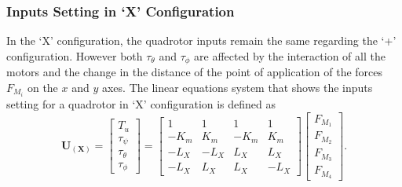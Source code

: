 \subsubsection{Inputs Setting in `X' Configuration}
In the `X' configuration, the quadrotor inputs remain the same regarding the `+' configuration. However both $\tau_\theta$ and $\tau_\phi$ are affected by the interaction of all the motors and the change in the distance of the point of application of the forces $F_{M_i}$ on the $x$ and $y$ axes. The linear equations system that shows the inputs setting for a quadrotor in `X' configuration is defined as
\begin{equation}
	\mathbf{U_{(X)}} = \begin{bmatrix}
	T_u\\[5pt]
	\tau_{\psi}\\[5pt]
	\tau_{\theta}\\[5pt]
	\tau_{\phi}
	\end{bmatrix} = \begin{bmatrix}
	1 & 1 & 1 & 1 \\[5pt]
	-K_{m} & K_{m} & -K_{m} & K_{m}\\[5pt]
	-L_{X} & -L_{X} & L_{X} & L_{X}\\[5pt]
	-L_{X} & L_{X} & L_{X} & -L_{X}
							\end{bmatrix}
\begin{bmatrix}
F_{M_1}\\[5pt]
F_{M_2}\\[5pt]
F_{M_3}\\[5pt]
F_{M_4}
\end{bmatrix}.
	\label{ec:U_X}						
\end{equation}

